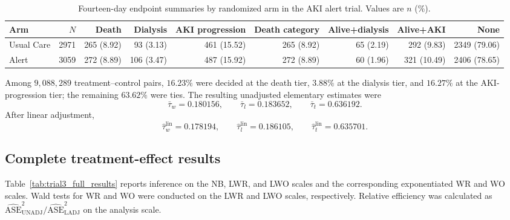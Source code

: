 \begin{table}[t]
\centering
\small
\caption{Fourteen-day endpoint summaries by randomized arm in the AKI alert trial. Values are
$n$ (\%).}
\label{tab:trial3_events}
\begin{tabular}{lrrrrrrrr}
\toprule
Arm & $N$ & Death & Dialysis & AKI progression &
Death category & Alive+dialysis & Alive+AKI & None \\
\midrule
Usual Care & 2971 & 265 (8.92) & 93 (3.13) & 461 (15.52) &
265 (8.92) & 65 (2.19) & 292 (9.83) & 2349 (79.06) \\
Alert & 3059 & 272 (8.89) & 106 (3.47) & 487 (15.92) &
272 (8.89) & 60 (1.96) & 321 (10.49) & 2406 (78.65) \\
\bottomrule
\end{tabular}
\end{table}

Among $9{,}088{,}289$ treatment--control pairs, $16.23\%$ were decided at the death
tier, $3.88\%$ at the dialysis tier, and $16.27\%$ at the AKI-progression tier; the
remaining $63.62\%$ were ties. The resulting unadjusted elementary estimates were
\[
  \bar\tau_w=0.180156,\qquad
  \bar\tau_l=0.183652,\qquad
  \bar\tau_t=0.636192.
\]
After linear adjustment,
\[
  \widehat\tau_w^{\mathrm{lin}}=0.178194,\qquad
  \widehat\tau_l^{\mathrm{lin}}=0.186105,\qquad
  \widehat\tau_t^{\mathrm{lin}}=0.635701.
\]

\subsection{Complete treatment-effect results}

Table~\ref{tab:trial3_full_results} reports inference on the NB, LWR, and LWO scales and
the corresponding exponentiated WR and WO scales. Wald tests for WR and WO were conducted
on the LWR and LWO scales, respectively. Relative efficiency was calculated as
$\widehat{\mathrm{ASE}}_{\mathrm{UNADJ}}^2/
 \widehat{\mathrm{ASE}}_{\mathrm{LADJ}}^2$ on the analysis scale.

